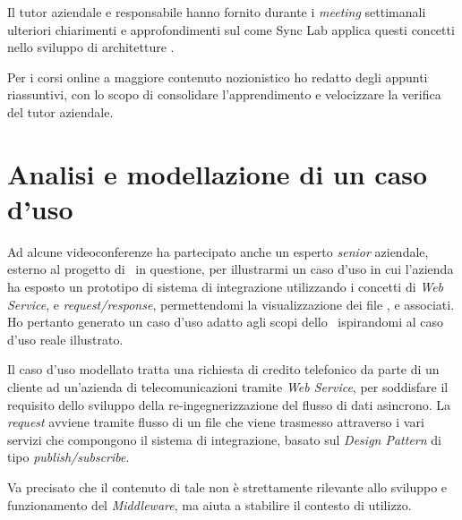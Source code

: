 Il tutor aziendale e responsabile  hanno fornito durante i \textit{meeting} settimanali ulteriori chiarimenti e approfondimenti sul come Sync Lab applica questi concetti nello sviluppo di architetture \software.

Per i corsi online a maggiore contenuto nozionistico ho redatto degli appunti riassuntivi, con lo scopo di consolidare l'apprendimento e velocizzare la verifica del tutor aziendale.

\section{Analisi e modellazione di un caso d'uso}

Ad alcune videoconferenze ha partecipato anche un esperto \textit{senior} aziendale, esterno al progetto di \stage\ in questione, per illustrarmi un caso d'uso in cui l'azienda ha esposto un prototipo di sistema di integrazione utilizzando i concetti di \textit{Web Service},  e \textit{request/response}, permettendomi la visualizzazione dei file ,  e  associati.
Ho pertanto generato un caso d'uso adatto agli scopi dello \stage\ ispirandomi al caso d'uso reale illustrato.

Il caso d'uso modellato tratta una richiesta di credito telefonico da parte di un cliente ad un'azienda di telecomunicazioni tramite \textit{Web Service}, per soddisfare il requisito dello sviluppo della re-ingegnerizzazione del flusso di dati asincrono.
La \textit{request} avviene tramite flusso di un file  che viene trasmesso attraverso i vari servizi che compongono il sistema di integrazione, basato sul \textit{Design Pattern} di tipo \textit{publish/subscribe}.

Va precisato che il contenuto di tale  non è strettamente rilevante allo sviluppo e funzionamento del \textit{Middleware}, ma aiuta a stabilire il contesto di utilizzo.


